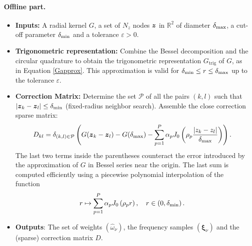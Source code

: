 \documentclass[smallextended]{svjour3}
\begin{document}
\paragraph{Offline part.}
\begin{itemize}
	\item[]\textbf{Inputs:} A radial kernel $G$, a set of $N_z$ nodes $\boldsymbol{z}$ in $\mathbb{R}^2$ of diameter $\delta_{\max}$, a cut-off parameter $\delta_{\min}$ and a tolerance $\varepsilon > 0$.
	\item[]\textbf{Trigonometric representation:} Combine the Bessel decomposition and the circular quadrature to obtain the trigonometric representation $G_\text{trig}$ of $G$, as in Equation \eqref{Gapprox}. This approximation is valid for $\delta_{\min} \leq r\leq \delta_{\max}$ up to the tolerance $\varepsilon$. 
	\item[]\textbf{Correction Matrix:} Determine the set $\mathcal{P}$ of all the pairs $(k,l)$ such that $\left\lvert \boldsymbol{z}_k - \boldsymbol{z}_l \right\rvert \leq \delta_{\min}$ (fixed-radius neighbor search). Assemble the close correction sparse matrix:
	      \begin{equation}
	      	\label{defD}
	      	D_{kl} = \delta_{(k,l) \in \mathcal{P}} \left( G({\boldsymbol{z}_k - \boldsymbol{z}_l}) - G(\delta_{\max}) - \sum_{p = 1}^{P} \alpha_p J_0\left(\rho_p\frac{\left\lvert z_k - z_l \right\rvert}{\delta_{\max}}\right)\right).
	      \end{equation}
	      The last two terms inside the parentheses counteract the error introduced by the approximation of $G$ in Bessel series near the origin. The last sum is computed efficiently using a piecewise polynomial interpolation of the function 
	      \[ r\mapsto \sum_{p = 1}^{P} \alpha_p J_0\left(\rho_pr\right),\quad r \in \left(0,\delta_{\min}\right). \]
	\item[] \textbf{Outputs}: The set of weights $(\hat{\omega}_\nu)$, the frequency samples $(\boldsymbol{\xi}_\nu)$ and the (sparse) correction  matrix $D$. 
\end{itemize}
\end{document}
